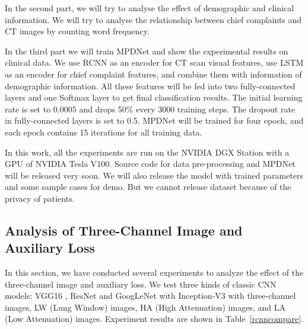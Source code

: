 \documentclass[journal]{IEEEtran}
\begin{document}
In the second part, we will try to analyse the effect of demographic and clinical information. We will try to analyse the relationship between chief complaints and CT images by counting word frequency.

In the third part we will train MPDNet and show the experimental results on clinical data. We use RCNN as an encoder for CT scan visual features, use LSTM as an encoder for chief complaint features, and combine them with information of demographic information. All these features will be fed into two fully-connected layers and one Softmax layer to get final classification results. The initial learning rate is set to 0.0005 and drops 50\% every 3000 training steps. The dropout rate in fully-connected layers is set to 0.5. MPDNet will be trained for four epoch, and each epoch contains 15 iterations for all training data. 

In this work, all the experiments are run on the NVIDIA DGX Station with a GPU of NVIDIA Tesla V100. 
Source code for data pre-processing and MPDNet will be released very soon. We will also release the model with trained parameters and some sample cases for demo. But we cannot release dataset because of the privacy of patients. 

    
\subsection{Analysis of Three-Channel Image and Auxiliary Loss}
\label{effectiveness}

In this section, we have conducted several experiments to analyze the effect of the three-channel image and auxiliary loss. 
We test three kinds of classic CNN models: VGG16 \cite{simonyan2015very}, ResNet \cite{he2016deep} and GoogLeNet with Inception-V3 \cite{szegedy2016rethinking} with three-channel images, LW (Lung Window) images, HA (High Attenuation) images, and LA (Low Attenuation) images. Experiment results are shown in Table~\ref{rcnncompare}. 
\end{document}
